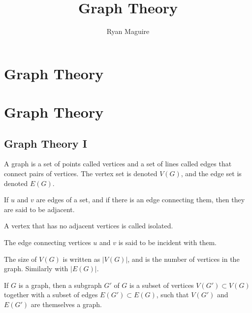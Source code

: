 \documentclass[crop=false,class=book,oneside]{standalone}
\begin{document}
    \ifx\ifmathcourses\undefined
        \title{Graph Theory}
        \author{Ryan Maguire}
        \date{\vspace{-5ex}}
        \maketitle
        \tableofcontents
        \chapter*{Graph Theory}
        \setcounter{chapter}{1}
    \else
        \chapter{Graph Theory}
    \fi
    \section{Graph Theory I}
        \begin{definition}
            A graph is a set of points called vertices and a set
            of lines called edges that connect pairs of vertices.
            The vertex set is denoted $V(G)$, and the edge
            set is denoted $E(G)$.
        \end{definition}
        \begin{definition}
            If $u$ and $v$ are edges of a set, and if there
            is an edge connecting them, then they
            are said to be adjacent. 
        \end{definition}
        \begin{definition}
            A vertex that has no adjacent
            vertices is called isolated.
        \end{definition}
        \begin{definition}
            The edge connecting vertices $u$ and
            $v$ is said to be incident with them.
        \end{definition}
        \begin{definition}
            The size of $V(G)$ is written as $|V(G)|$, and
            is the number of vertices in the graph.
            Similarly with $|E(G)|$.
        \end{definition}
        \begin{definition}
            If $G$ is a graph, then a subgraph $G'$ of
            $G$ is a subset of vertices $V(G')\subset{V(G)}$
            together with a subset of edges
            $E(G')\subset{E(G)}$, such that $V(G')$
            and $E(G')$ are themselves a graph.
        \end{definition}
\end{document}
